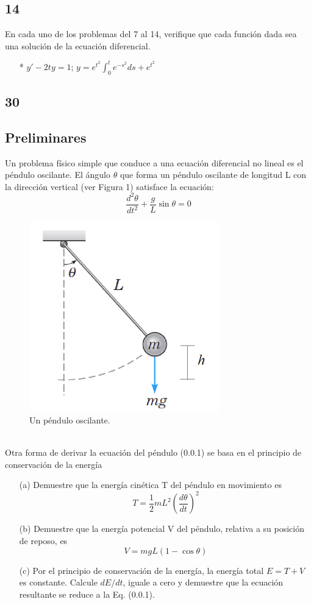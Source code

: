 \documentclass{book}
\numberwithin{equation}{section}
\theoremstyle{plain}  %
\begin{document}
    \subsection*{14}
    En cada uno de los problemas del 7 al 14, verifique que cada función dada sea una solución de la ecuación diferencial.
    \begin{itemize}
        \item[*] $y'-2ty=1$; $y=e^{t^{2}}\int_{0}^{t}e^{-s^{2}}ds+e^{t^{2}}$
    \end{itemize}
    \subsection*{30}
    \subsection*{Preliminares} 
    Un problema físico simple que conduce a una ecuación diferencial no lineal 
    es el péndulo oscilante. El ángulo $\theta$ que forma un péndulo oscilante de longitud L con 
    la dirección vertical (ver Figura 1) satisface la ecuación:
    \begin{equation}
        \frac{d^{2}\theta}{dt^{2}} + \frac{g}{L} \sin{\theta} = 0
    \end{equation}
    \begin{figure}[h]
        \centering
        \includegraphics[width=0.4\linewidth]{imagenes/EDC1.png}
        \caption{Un péndulo oscilante.}
      \end{figure} \\
    Otra forma de derivar la ecuación del péndulo (0.0.1) se basa en el principio de conservación de la energía
    \begin{itemize}
        \item[(a)] Demuestre que la energía cinética T del péndulo en movimiento es
        \begin{equation*}
            T=\frac{1}{2}mL^{2}(\frac{d\theta}{dt})^{2}
        \end{equation*}
        \item[(b)] Demuestre que la energía potencial V del péndulo, relativa a su posición de reposo, es
        \begin{equation*}
            V = mgL(1-\cos{\theta})
        \end{equation*} 
        \item[(c)] Por el principio de conservación de la energía, la energía total $E = T + V$ es constante. 
        Calcule $dE/dt$, iguale a cero y demuestre que la ecuación resultante se reduce a la Eq. (0.0.1).
    \end{itemize}
\end{document}
